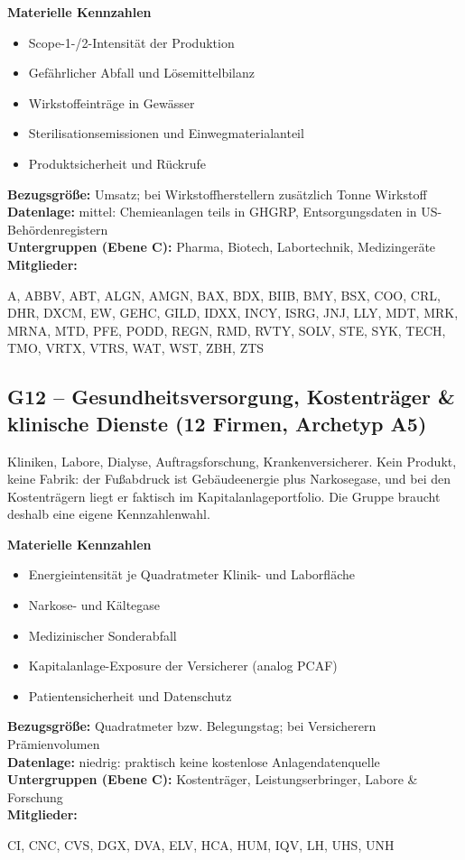 \noindent\textbf{Materielle Kennzahlen}
\begin{itemize}[nosep,leftmargin=1.2em]
  \item Scope-1-/2-Intensität der Produktion
  \item Gefährlicher Abfall und Lösemittelbilanz
  \item Wirkstoffeinträge in Gewässer
  \item Sterilisationsemissionen und Einwegmaterialanteil
  \item Produktsicherheit und Rückrufe
\end{itemize}
\noindent\textbf{Bezugsgröße:} Umsatz; bei Wirkstoffherstellern zusätzlich Tonne Wirkstoff\\
\textbf{Datenlage:} mittel: Chemieanlagen teils in GHGRP, Entsorgungsdaten in US-Behördenregistern\\
\textbf{Untergruppen (Ebene C):} Pharma, Biotech, Labortechnik, Medizingeräte\\
\textbf{Mitglieder:} {\raggedright\small\ttfamily A, ABBV, ABT, ALGN, AMGN, BAX, BDX, BIIB, BMY, BSX, COO, CRL, DHR, DXCM, EW, GEHC, GILD, IDXX, INCY, ISRG, JNJ, LLY, MDT, MRK, MRNA, MTD, PFE, PODD, REGN, RMD, RVTY, SOLV, STE, SYK, TECH, TMO, VRTX, VTRS, WAT, WST, ZBH, ZTS\par}

\medskip
\subsection*{G12 -- Gesundheitsversorgung, Kostenträger \& klinische Dienste \normalfont\small (12 Firmen, Archetyp A5)}
\noindent Kliniken, Labore, Dialyse, Auftragsforschung, Krankenversicherer. Kein Produkt, keine Fabrik: der Fußabdruck ist Gebäudeenergie plus Narkosegase, und bei den Kostenträgern liegt er faktisch im Kapitalanlageportfolio. Die Gruppe braucht deshalb eine eigene Kennzahlenwahl.

\noindent\textbf{Materielle Kennzahlen}
\begin{itemize}[nosep,leftmargin=1.2em]
  \item Energieintensität je Quadratmeter Klinik- und Laborfläche
  \item Narkose- und Kältegase
  \item Medizinischer Sonderabfall
  \item Kapitalanlage-Exposure der Versicherer (analog PCAF)
  \item Patientensicherheit und Datenschutz
\end{itemize}
\noindent\textbf{Bezugsgröße:} Quadratmeter bzw. Belegungstag; bei Versicherern Prämienvolumen\\
\textbf{Datenlage:} niedrig: praktisch keine kostenlose Anlagendatenquelle\\
\textbf{Untergruppen (Ebene C):} Kostenträger, Leistungserbringer, Labore \& Forschung\\
\textbf{Mitglieder:} {\raggedright\small\ttfamily CI, CNC, CVS, DGX, DVA, ELV, HCA, HUM, IQV, LH, UHS, UNH\par}

